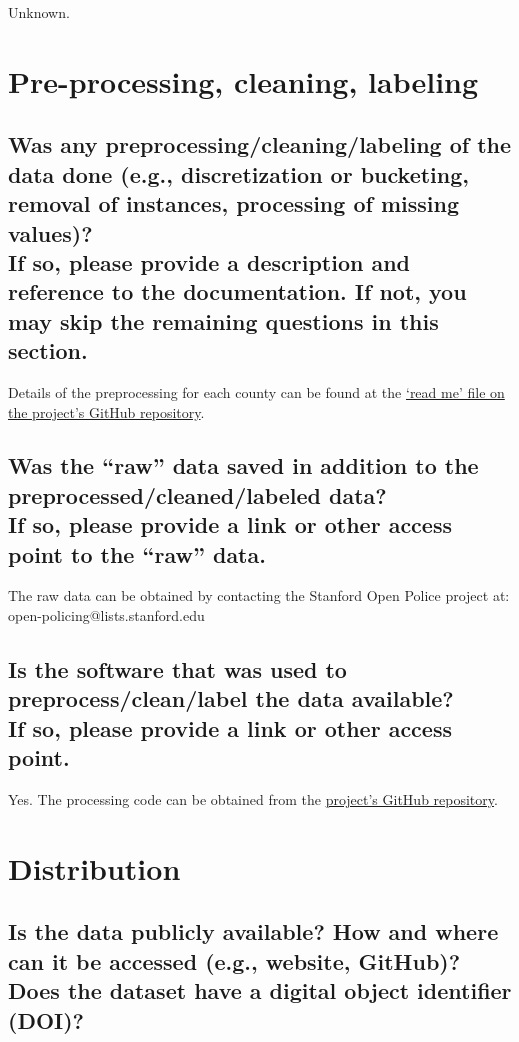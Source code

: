 \documentclass[letterpaper, 10 pt, conference]{ieeeconf}  %
\newcommand{\subtitle}[1]{{\\ \small \normalfont \color{purple} #1}}
\begin{document}
Unknown.

\section{Pre-processing, cleaning, labeling}

\subsection{Was any preprocessing/cleaning/labeling of the data done (e.g., discretization or bucketing, removal of instances, processing of missing values)? \subtitle{If so, please provide a description and reference to the documentation. If not, you may skip the remaining questions in this section.}}

Details of the preprocessing for each county can be found at the \href{https://github.com/stanford-policylab/opp/blob/master/data_readme.md}{`read me' file on the project's GitHub repository}.

\subsection{Was the “raw” data saved in addition to the preprocessed/cleaned/labeled data? \subtitle{If so, please provide a link or other access point to the “raw” data. }}

The raw data can be obtained by contacting the Stanford Open Police project at: open-policing@lists.stanford.edu

\subsection{Is the software that was used to preprocess/clean/label the data available? \subtitle{If so, please provide a link or other access point.}}

Yes. The processing code can be obtained from the \href{https://github.com/stanford-policylab/opp}{project's GitHub repository}.

\section{Distribution}
\subsection{Is the data publicly available? How and where can it be accessed (e.g., website, GitHub)? \subtitle{Does the dataset have a digital object identifier (DOI)?}}
\end{document}

